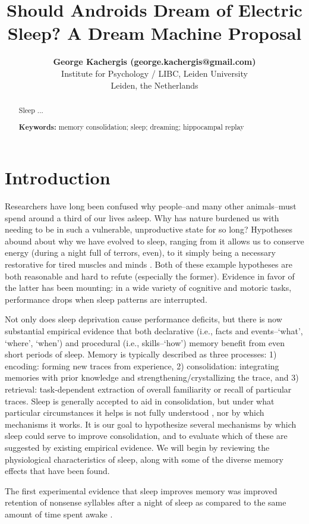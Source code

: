 \documentclass[10pt,letterpaper]{article}
\title{Should Androids Dream of Electric Sleep? A Dream Machine Proposal}
\author{{\large \bf George Kachergis (george.kachergis@gmail.com)} 
 \AND {\large \bf Roy de Kleijn (kleijnrde@fsw.leidenuniv.nl)} 
\AND {\large \bf Bernhard Hommel (hommel@fsw.leidenuniv.nl)} \\
  Institute for Psychology / LIBC, Leiden University \\
  Leiden, the Netherlands}
\begin{document}
\maketitle


\begin{abstract}
Sleep ...

\textbf{Keywords:} 
memory consolidation; sleep; dreaming; hippocampal replay
\end{abstract}


\section{Introduction}

Researchers have long been confused why people--and many other animals--must spend around a third of our lives asleep. Why has nature burdened us with needing to be in such a vulnerable, unproductive state for so long? Hypotheses abound about why we have evolved to sleep, ranging from it allows us to conserve energy (during a night full of terrors, even), to it simply being a necessary restorative for tired muscles and minds \cite{Siegel:2013}. Both of these example hypotheses are both reasonable and hard to refute (especially the former). Evidence in favor of the latter has been mounting: in a wide variety of cognitive and motoric tasks, performance drops when sleep patterns are interrupted. 

Not only does sleep deprivation cause performance deficits, but there is now substantial empirical evidence that both declarative (i.e., facts and events--`what', `where', `when') and procedural (i.e., skills--`how') memory benefit from even short periods of sleep. Memory is typically described as three processes: 1) encoding: forming new traces from experience, 2) consolidation: integrating memories with prior knowledge and strengthening/crystallizing the trace, and 3) retrieval: task-dependent extraction of overall familiarity or recall of particular traces. Sleep is generally accepted to aid in consolidation, but under what particular circumstances it helps is not fully understood \cite[for a review, see]{Diekelmann:2009}, nor by which mechanisms it works. It is our goal to hypothesize several mechanisms by which sleep could serve to improve consolidation, and to evaluate which of these are suggested by existing empirical evidence. We will begin by reviewing the physiological characteristics of sleep, along with some of the diverse memory effects that have been found. 

The first experimental evidence that sleep improves memory was improved retention of nonsense syllables after a night of sleep as compared to the same amount of time spent awake \cite{Jenkins:1924}. 
\end{document}
